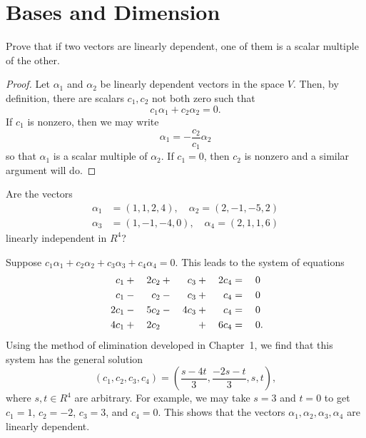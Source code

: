 \section{Bases and Dimension}

\label{exercise:vec-spaces:two-lin-dep-vecs}
Prove that if two vectors are linearly dependent, one of them is a
scalar multiple of the other.
\begin{proof}
  Let $\alpha_1$ and $\alpha_2$ be linearly dependent vectors in the
  space $V$. Then, by definition, there are scalars $c_1, c_2$ not
  both zero such that
  \begin{equation*}
    c_1\alpha_1 + c_2\alpha_2 = 0.
  \end{equation*}
  If $c_1$ is nonzero, then we may write
  \begin{equation*}
    \alpha_1 = -\frac{c_2}{c_1}\alpha_2
  \end{equation*}
  so that $\alpha_1$ is a scalar multiple of $\alpha_2$. If $c_1 = 0$,
  then $c_2$ is nonzero and a similar argument will do.
\end{proof}

\label{exercise:vec-spaces:vecs-in-R4}
Are the  vectors
\begin{align*}
  \alpha_1 &= (1, 1, 2, 4), \quad \alpha_2 = (2, -1, -5, 2) \\
  \alpha_3 &= (1, -1, -4, 0), \quad \alpha_4 = (2, 1, 1, 6)
\end{align*}
linearly independent in $R^4$?
\begin{solution}
  Suppose $c_1\alpha_1 + c_2\alpha_2 + c_3\alpha_3 + c_4\alpha_4 =
  0$. This leads to the system of equations
  \begin{alignat*}{5}
    c_1 &{}+{}& 2c_2 &{}+{}& c_3 &{}+{}& 2c_4 &{}={}& 0 \\
    c_1 &{}-{}& c_2 &{}-{}& c_3 &{}+{}& c_4 &{}={}& 0 \\
    2c_1 &{}-{}& 5c_2 &{}-{}& 4c_3 &{}+{}& c_4 &{}={}& 0 \\
    4c_1 &{}+{}& 2c_2 && &{}+{}& 6c_4 &{}={}& 0\rlap.
  \end{alignat*}
  Using the method of elimination developed in Chapter~1, we find that
  this system has the general solution
  \begin{equation*}
    (c_1,c_2,c_3,c_4) = \left(\frac{s - 4t}3, \frac{-2s - t}3, s, t\right),
  \end{equation*}
  where $s,t\in R^4$ are arbitrary. For example, we may take $s = 3$
  and $t = 0$ to get $c_1 = 1$, $c_2 = -2$, $c_3 = 3$, and $c_4 =
  0$. This shows that the vectors
  $\alpha_1,\alpha_2,\alpha_3,\alpha_4$ are linearly dependent.
\end{solution}

